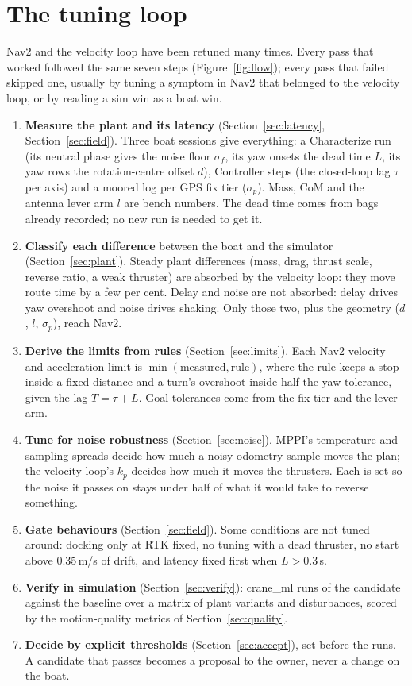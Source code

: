 \section{The tuning loop}
\label{sec:loop}

Nav2 and the velocity loop have been retuned many times. Every pass that worked followed
the same seven steps (Figure~\ref{fig:flow}); every pass that failed skipped one, usually by
tuning a symptom in Nav2 that belonged to the velocity loop, or by reading a sim win as a
boat win.

\begin{enumerate}[leftmargin=*, itemsep=2pt]
\item \textbf{Measure the plant and its latency} (Section~\ref{sec:latency},
  Section~\ref{sec:field}). Three boat sessions give everything: a Characterize run (its
  neutral phase gives the noise floor $\sigma_f$, its yaw onsets the dead time $L$, its yaw
  rows the rotation-centre offset $d$), Controller steps (the closed-loop lag $\tau$ per
  axis) and a moored log per GPS fix tier ($\sigma_p$). Mass, CoM and the antenna lever arm
  $l$ are bench numbers. The dead time comes from bags already recorded; no new run is
  needed to get it.
\item \textbf{Classify each difference} between the boat and the simulator
  (Section~\ref{sec:plant}). Steady plant differences (mass, drag, thrust scale, reverse
  ratio, a weak thruster) are absorbed by the velocity loop: they move route time by a few
  per cent. Delay and noise are not absorbed: delay drives yaw overshoot and noise drives
  shaking. Only those two, plus the geometry ($d$, $l$, $\sigma_p$), reach Nav2.
\item \textbf{Derive the limits from rules} (Section~\ref{sec:limits}). Each Nav2 velocity
  and acceleration limit is $\min(\text{measured}, \text{rule})$, where the rule keeps a
  stop inside a fixed distance and a turn's overshoot inside half the yaw tolerance, given
  the lag $T = \tau + L$. Goal tolerances come from the fix tier and the lever arm.
\item \textbf{Tune for noise robustness} (Section~\ref{sec:noise}). MPPI's temperature and
  sampling spreads decide how much a noisy odometry sample moves the plan; the velocity
  loop's $k_p$ decides how much it moves the thrusters. Each is set so the noise it passes on
  stays under half of what it would take to reverse something.
\item \textbf{Gate behaviours} (Section~\ref{sec:field}). Some conditions are not tuned around:
  docking only at RTK fixed, no tuning with a dead thruster, no start above 0.35\,m/s of
  drift, and latency fixed first when $L > 0.3$\,s.
\item \textbf{Verify in simulation} (Section~\ref{sec:verify}): crane\_ml runs of the
  candidate against the baseline over a matrix of plant variants and disturbances, scored by
  the motion-quality metrics of Section~\ref{sec:quality}.
\item \textbf{Decide by explicit thresholds} (Section~\ref{sec:accept}), set before the runs.
  A candidate that passes becomes a proposal to the owner, never a change on the boat.
\end{enumerate}


